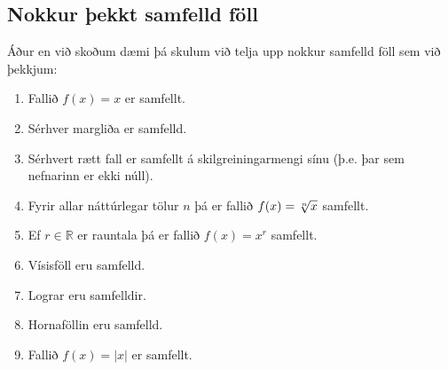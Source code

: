 \documentclass[a4paper,10pt,icelandic]{sphinxmanual}
\begin{document}
\subsection{Nokkur þekkt samfelld föll}
\label{\detokenize{Kafli10:nokkur-ekkt-samfelld-foll}}
Áður en við skoðum dæmi þá skulum við telja upp nokkur samfelld föll sem við þekkjum:
\begin{enumerate}
%
\item {} 
Fallið \(f(x)=x\) er samfellt.

\item {} 
Sérhver margliða er samfelld.

\item {} 
Sérhvert rætt fall er samfellt á skilgreiningarmengi sínu (þ.e. þar sem nefnarinn er ekki núll).

\item {} 
Fyrir allar náttúrlegar tölur \(n\) þá er fallið \(f(x)=\root n \of {x}\) samfellt.

\item {} 
Ef \(r \in \mathbb{R}\) er rauntala þá er fallið \(f(x)=x^r\) samfellt.

\item {} 
Vísisföll eru samfelld.

\item {} 
Lograr eru samfelldir.

\item {} 
Hornaföllin eru samfelld.

\item {} 
Fallið \(f(x)=|x|\) er samfellt.

\end{enumerate}
\end{document}
